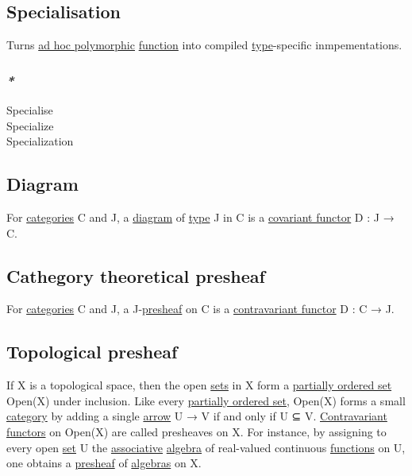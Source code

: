 \documentclass[11pt]{article}
\begin{document}
\subsection{\label{orgf3af43a}Specialisation}
\label{sec:org864b872}
Turns \hyperref[orge82f696]{ad hoc polymorphic} \hyperref[orgeb5cddb]{function} into compiled \hyperref[org4fbaeb8]{type}-specific inmpementations.\\

\subsubsection{\emph{*}}
\label{sec:org55a35d8}

\label{org2cb8fef}Specialise\\
\label{org0a1a6c3}Specialize\\
\label{orgd35ab95}Specialization\\

\subsection{\label{org9305b8d}Diagram}
\label{sec:org9af847a}

For \hyperref[org43ea200]{categories} C and J, a \hyperref[org9305b8d]{diagram} of \hyperref[org4fbaeb8]{type} J in C is a \hyperref[orgdf09291]{covariant functor} D : J → C.\\

\subsection{Cathegory theoretical \label{org53b2988}presheaf}
\label{sec:org4ebfb80}

For \hyperref[org43ea200]{categories} C and J, a J-\hyperref[org53b2988]{presheaf} on C is a \hyperref[org4f18281]{contravariant functor} D : C → J.\\

\subsection{Topological \label{org7304f7b}presheaf}
\label{sec:orge7cb085}

If X is a topological space, then the open \hyperref[org4e7443a]{sets} in X form a \hyperref[org63f1dad]{partially ordered set} Open(X) under inclusion. Like every \hyperref[org63f1dad]{partially ordered set}, Open(X) forms a small \hyperref[org3e3a79b]{category} by adding a single \hyperref[org5b6e6e9]{arrow} U → V if and only if U ⊆ V. \hyperref[org47a73bb]{Contravariant} \hyperref[org6c3c2a6]{functors} on Open(X) are called presheaves on X. For instance, by assigning to every open \hyperref[orgbed80ba]{set} U the \hyperref[org31bffbb]{associative} \hyperref[orgecde2fc]{algebra} of real-valued continuous \hyperref[org66c5288]{functions} on U, one obtains a \hyperref[org53b2988]{presheaf} of \hyperref[org238196c]{algebras} on X.\\
\end{document}
